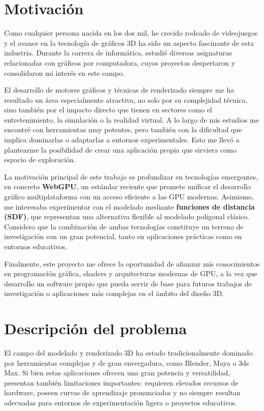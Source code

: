 \section{Motivación}

Como cualquier persona nacida en los dos mil, he crecido rodeado de videojuegos
y el avance en la tecnología de gráficos 3D ha sido un aspecto fascinante de
esta industria. Durante la carrera de informática, estudié diversas asignaturas
relacionadas con gráficos por computadora, cuyos proyectos despertaron y
consolidaron mi interés en este campo.

El desarrollo de motores gráficos y técnicas de renderizado siempre me ha
resultado un área especialmente atractiva, no solo por su complejidad técnica,
sino también por el impacto directo que tienen en sectores como el
entretenimiento, la simulación o la realidad virtual. A lo largo de mis
estudios me encontré con herramientas muy potentes, pero también con la
dificultad que implica dominarlas o adaptarlas a entornos experimentales. Esto
me llevó a plantearme la posibilidad de crear una aplicación propia que
sirviera como espacio de exploración.

La motivación principal de este trabajo es profundizar en tecnologías
emergentes, en concreto \textbf{WebGPU}, un estándar reciente que promete
unificar el desarrollo gráfico multiplataforma con un acceso eficiente a las
GPU modernas. Asimismo, me interesaba experimentar con el modelado mediante
\textbf{funciones de distancia (SDF)}, que representan una alternativa flexible
al modelado poligonal clásico. Considero que la combinación de ambas
tecnologías constituye un terreno de investigación con un gran potencial, tanto
en aplicaciones prácticas como en entornos educativos.

Finalmente, este proyecto me ofrece la oportunidad de afianzar mis
conocimientos en programación gráfica, shaders y arquitecturas modernas de GPU,
a la vez que desarrollo un software propio que pueda servir de base para
futuros trabajos de investigación o aplicaciones más complejas en el ámbito del
diseño 3D.

\section{Descripción del problema}

El campo del modelado y renderizado 3D ha estado tradicionalmente dominado por
herramientas complejas y de gran envergadura, como Blender, Maya o 3ds Max. Si
bien estas aplicaciones ofrecen una gran potencia y versatilidad, presentan
también limitaciones importantes: requieren elevados recursos de hardware,
poseen curvas de aprendizaje pronunciadas y no siempre resultan adecuadas para
entornos de experimentación ligera o proyectos educativos.


